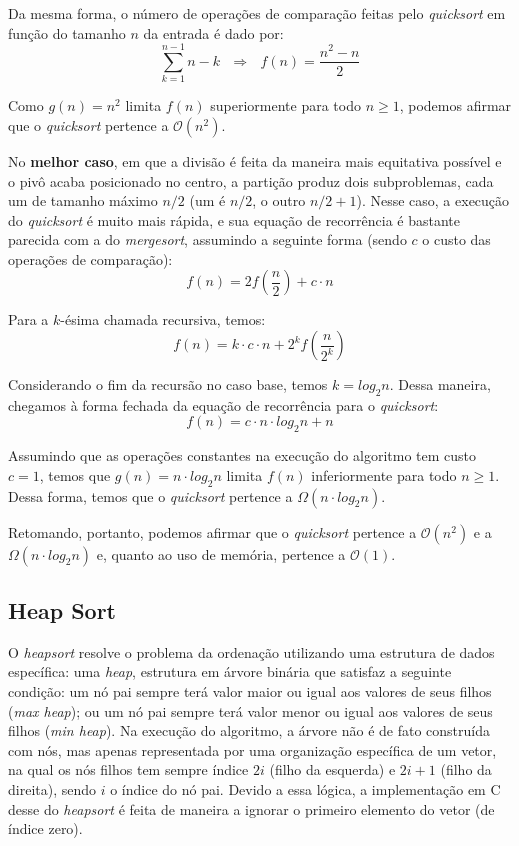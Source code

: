 \documentclass[fontsize=10pt]{article}
\begin{document}
\quad Da mesma forma, o número de operações de comparação feitas pelo \textit{quicksort} em função do tamanho $n$ da entrada é dado por:
\[\sum_{k=1}^{n-1} n - k \ \ \ \Longrightarrow \ \ \ f(n) = \frac{n^2 - n}{2}\]

\quad Como $g(n) = n^2$ limita $f(n)$ superiormente para todo $n \geq 1$, podemos afirmar que o \textit{quicksort} pertence a $\mathcal{O}(n^2)$.

\quad No \textbf{melhor caso}, em que a divisão é feita da maneira mais equitativa possível e o pivô acaba posicionado no centro, a partição produz dois subproblemas, cada um de tamanho máximo $n/2$ (um é $n/2$, o outro $n/2 + 1$). Nesse caso, a execução do \textit{quicksort} é muito mais rápida, e sua equação de recorrência é bastante parecida com a do \textit{mergesort}, assumindo a seguinte forma (sendo $c$ o custo das operações de comparação):
\[f(n) = 2f(\frac{n}{2}) + c \cdot n\]

\quad Para a $k$-ésima chamada recursiva, temos:
\[f(n) = k \cdot c \cdot n + 2^k f(\frac{n}{2^k})\]

\quad Considerando o fim da recursão no caso base, temos $k = log_2n$. Dessa maneira, chegamos à forma fechada da equação de recorrência para o \textit{quicksort}:
\[f(n) = c \cdot n \cdot log_2n + n\]

\quad Assumindo que as operações constantes na execução do algoritmo tem custo $c = 1$, temos que $g(n) = n \cdot log_2n$ limita $f(n)$ inferiormente para todo $n \geq 1$. Dessa forma, temos que o \textit{quicksort} pertence a $\Omega(n \cdot log_2n)$.

\quad Retomando, portanto, podemos afirmar que o \textit{quicksort} pertence a $\mathcal{O}(n^2)$ e a $\Omega(n \cdot log_2n)$ e, quanto ao uso de memória, pertence a $\mathcal{O}(1)$.

\subsection{Heap Sort}

\quad O \textit{heapsort} resolve o problema da ordenação utilizando uma estrutura de dados específica: uma \textit{heap}, estrutura em árvore binária que satisfaz a seguinte condição: um nó pai sempre terá valor maior ou igual aos valores de seus filhos (\textit{max heap}); ou um nó pai sempre terá valor menor ou igual aos valores de seus filhos (\textit{min heap}). Na execução do algoritmo, a árvore não é de fato construída com nós, mas apenas representada por uma organização específica de um vetor, na qual os nós filhos tem sempre índice $2i$ (filho da esquerda) e $2i + 1$ (filho da direita), sendo $i$ o índice do nó pai. Devido a essa lógica, a implementação em C desse do \textit{heapsort} é feita de maneira a ignorar o primeiro elemento do vetor (de índice zero).
\end{document}
